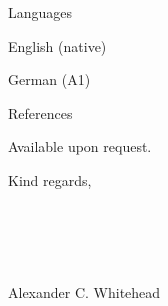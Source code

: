\documentclass{cv}
\begin{document}
    \begin{rSection}{Languages}
        \item English (native)
        \item German (A1)
        \\
    \end{rSection}

    \begin{rSection}{References}
        \item Available upon request.
        \\
    \end{rSection}
    
    \begin{rSection}{}
        \item Kind regards,
        \\
        \\
        \\
        \\
        \\
        \item Alexander C. Whitehead
    \end{rSection}

    \newpage
\end{document}
